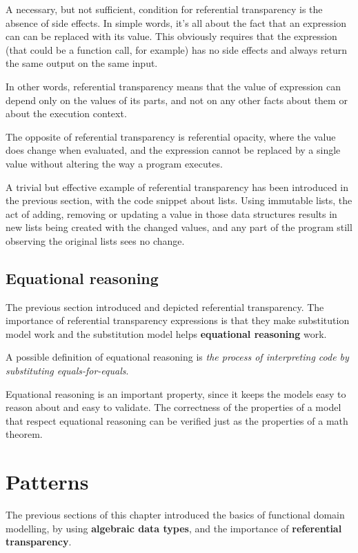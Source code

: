 A necessary, but not sufficient, condition for referential transparency
is the absence of side effects. In simple words, it's all about the fact
that an expression can can be replaced with its value. This obviously
requires that the expression (that could be a function call, for
example) has no side effects and always return the same output on the
same input.

In other words, referential transparency means that the value of
expression can depend only on the values of its parts, and not on any
other facts about them or about the execution context.

The opposite of referential transparency is referential opacity, where
the value does change when evaluated, and the expression cannot be
replaced by a single value without altering the way a program executes.

A trivial but effective example of referential transparency has been
introduced in the previous section, with the code snippet about lists.
Using immutable lists, the act of adding, removing or updating a value
in those data structures results in new lists being created with the
changed values, and any part of the program still observing the original
lists sees no change.

\subsection{Equational reasoning}\label{equational-reasoning}

The previous section introduced and depicted referential transparency.
The importance of referential transparency expressions is that they make
substitution model work and the substitution model helps
\textbf{equational reasoning} work.

A possible definition of equational reasoning is \emph{the process of
interpreting code by substituting equals-for-equals}.

Equational reasoning is an important property, since it keeps the models
easy to reason about and easy to validate. The correctness of the
properties of a model that respect equational reasoning can be verified
just as the properties of a math theorem.


\section{Patterns}\label{patterns}

The previous sections of this chapter introduced the basics of
functional domain modelling, by using \textbf{algebraic data types}, and
the importance of \textbf{referential transparency}.

